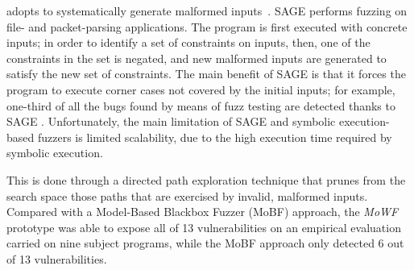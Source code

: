  adopts  to systematically generate malformed inputs~\cite{godefroid2012sage}. SAGE performs fuzzing on file- and packet-parsing applications. 
The program is first executed with concrete inputs; in order to identify a set of constraints on inputs, then, one of the constraints in the set is negated, and new malformed inputs are generated to satisfy the new set of constraints. 
The main benefit of SAGE is that it forces the program to execute corner cases not covered by the initial inputs; for example, 
one-third of all the bugs found by means of fuzz testing are detected thanks to SAGE \cite{bounimova2013billions}.
Unfortunately, the main limitation of SAGE and symbolic execution-based fuzzers is limited scalability, due to the high execution time required by symbolic execution.


 This is done through a directed path exploration technique that prunes from the search space those paths that are exercised by invalid, malformed inputs.
Compared with a Model-Based Blackbox Fuzzer (MoBF) approach, the \emph{MoWF} prototype was able to expose all of 13 vulnerabilities on an empirical evaluation carried on nine subject programs, while the MoBF approach only detected 6 out of 13 vulnerabilities. 

